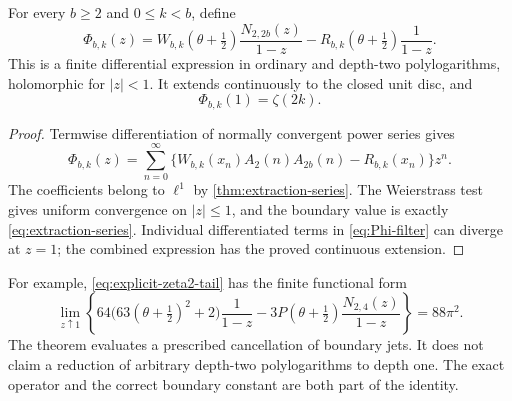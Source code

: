 \begin{theorem}
\label{thm:polylog-filter}
For every $b\geq2$ and $0\leq k<b$, define
\begin{equation}\label{eq:Phi-filter}
 \Phi_{b,k}(z)=
 W_{b,k}(\theta+\tfrac12)\frac{N_{2,2b}(z)}{1-z}
 -R_{b,k}(\theta+\tfrac12)\frac1{1-z}.
\end{equation}
This is a finite differential expression in ordinary and depth-two
polylogarithms, holomorphic for $|z|<1$. It extends continuously to
the closed unit disc, and
\begin{equation}\label{eq:Phi-boundary}
 \boxed{\Phi_{b,k}(1)=\zeta(2k).}
\end{equation}
\end{theorem}
\begin{proof}
Termwise differentiation of normally convergent power series gives
\[
 \Phi_{b,k}(z)=\sum_{n=0}^{\infty}
 \{W_{b,k}(x_n)A_2(n)A_{2b}(n)-R_{b,k}(x_n)\}z^n.
\]
The coefficients belong to $\ell^1$ by
\cref{thm:extraction-series}. The Weierstrass test gives uniform
convergence on $|z|\leq1$, and the boundary value is exactly
\eqref{eq:extraction-series}. Individual differentiated terms in
\eqref{eq:Phi-filter} can diverge at $z=1$; the combined expression
has the proved continuous extension.
\end{proof}

For example, \eqref{eq:explicit-zeta2-tail} has the finite functional
form
\begin{equation}\label{eq:explicit-boundary-operator}
 \lim_{z\uparrow1}
 \left\{64\bigl(63(\theta+\tfrac12)^2+2\bigr)\frac1{1-z}
       -3P(\theta+\tfrac12)\frac{N_{2,4}(z)}{1-z}\right\}
 =88\pi^2.
\end{equation}
The theorem evaluates a prescribed cancellation of boundary jets.
It does not claim a reduction of arbitrary depth-two polylogarithms
to depth one. The exact operator and the correct boundary constant
are both part of the identity.
